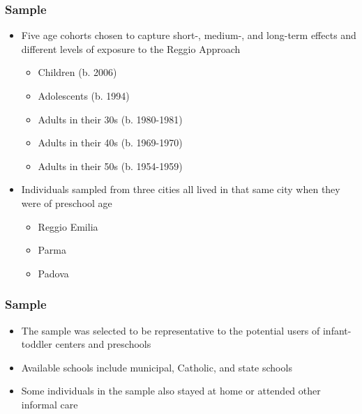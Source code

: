 \documentclass[dynamic]{JJH-Beamer}
\begin{document}

\begin{frame}
\frametitle{Sample}
\begin{itemize}
	\item Five age cohorts chosen to capture short-, medium-, and long-term effects and different levels of exposure to the Reggio Approach
	\begin{itemize}
		\item Children (b. 2006)
		\item Adolescents (b. 1994)
		\item Adults in their 30s (b. 1980-1981)
		\item Adults in their 40s (b. 1969-1970)
		\item Adults in their 50s (b. 1954-1959)
	\end{itemize}
	\item Individuals sampled from three cities all lived in that same city when they were of preschool age
		\begin{itemize}
			\item Reggio Emilia
			\item Parma
			\item Padova
		\end{itemize}
\end{itemize}
\end{frame}

\begin{frame}
\frametitle{Sample}
\begin{itemize}
	\item The sample was selected to be representative to the potential users of infant-toddler centers and preschools
	\item Available schools include municipal, Catholic, and state schools
	\item Some individuals in the sample also stayed at home or attended other informal care
\end{itemize}
\end{frame}

\end{document}
